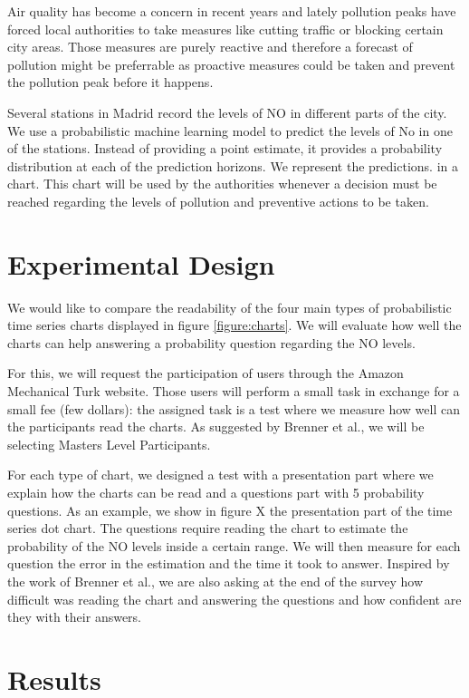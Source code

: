 \documentclass[a4paper,3p,sort&compress]{elsarticle}
\begin{document}
Air quality has become a concern in recent years and lately pollution peaks have forced local authorities to take measures like cutting traffic or blocking certain city areas. Those measures are purely reactive and therefore a forecast of pollution might be preferrable as proactive measures could be taken and prevent the pollution peak before it happens.

Several stations in Madrid record the levels of NO in different parts of the city. We use a probabilistic
machine learning model to predict the levels of No in one of the stations. Instead of providing a point estimate, it provides a 
probability distribution at each of the prediction horizons. We represent the predictions. in a chart. This chart will be used by the
authorities whenever a decision must be reached regarding the levels of pollution and preventive actions to be taken.

\section{Experimental Design}
\label{sec:exp_design}

We would like to compare the readability of the four main types of probabilistic time series charts displayed in figure 
\ref{figure:charts}. We will evaluate how well the charts can help answering a probability question regarding the NO levels.

For this, we will request the participation of users through the Amazon Mechanical Turk website. Those users will perform a small task
in exchange for a small fee (few dollars): the assigned task is a test where we measure how well can the participants read the charts.
As suggested by Brenner et al., we will be selecting Masters Level Participants.

For each type of chart, we designed a test with a presentation part where we explain how the charts can be read and a questions part
with 5 probability questions. As an example, we show in figure X the presentation part of the time series dot chart. The questions
require reading the chart to estimate the probability of the NO levels inside a certain range. We will then measure for each question
the error in the estimation and the time it took to answer. Inspired by the work of Brenner et al., we are also asking at the end of 
the survey how difficult was reading the chart and answering the questions and how confident are they with their answers. 

\section{Results}
\label{sec:results}
\end{document}

